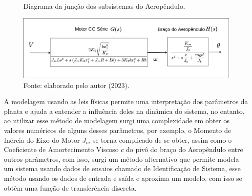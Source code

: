 \begin{figure}[!h]
	\centering
	\caption{Diagrama da junção dos subsistemas do  Aeropêndulo.}
            \includegraphics[width=1\textwidth, page=1]{Capitulos/2_aeropendulo/4_figuras/ft_subsistemas.png}
	\caption*{Fonte: elaborado pelo autor (2023).}
        \label{fig4:image_05}
\end{figure}



A modelagem usando as leis físicas permite uma interpretação dos parâmetros da planta e ajuda a entender a influência deles na dinâmica do sistema, no entanto, ao utilizar esse método de modelagem surgi uma complexidade em obter os valores numéricos de alguns desses parâmetros, por exemplo, o Momento de Inércia do Eixo do Motor $J_m$ se torna complicado de se obter, assim como o Coeficiente de Amortecimento Viscoso $c$ do pivô do braço do Aeropêndulo entre outros parâmetros, com isso, surgi um método alternativo que permite modela um sistema usando dados de ensaios chamado de Identificação de Sistema, esse método usando os dados de entrada e saída e aproxima um modelo, com isso se obtêm uma função de transferência discreta.